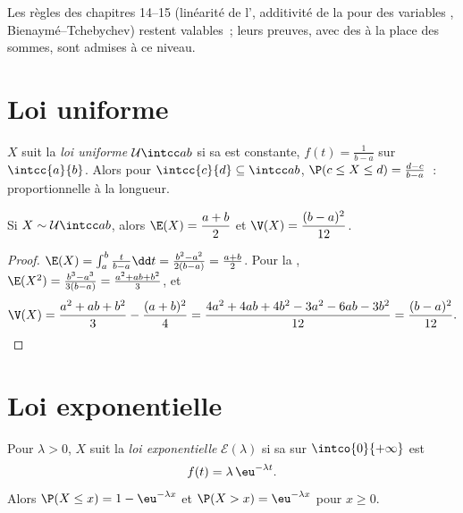 Les règles des chapitres 14--15 (linéarité de l', additivité de la
 pour des variables , Bienaymé--Tchebychev) restent
valables~; leurs preuves, avec des  à la place des sommes, sont
admises à ce niveau.

\section{Loi uniforme}

\begin{definition}\label{def:g12:contdist:uniform}
$X$ suit la \emph{loi uniforme}
$\mathcal U\intcc ab$ si sa  est constante,
$f(t) = \frac{1}{b-a}$ sur $\intcc{a}{b}$. Alors pour
$\intcc{c}{d} \subseteq \intcc ab$,
$\P(c \leq X \leq d) = \frac{d - c}{b - a}$~:  proportionnelle à
la longueur.
\end{definition}

\begin{proposition}\label{prop:g12:contdist:uniformmoments}
Si $X \sim \mathcal U\intcc ab$, alors
$\E(X) = \dfrac{a+b}{2}$ et $\V(X) = \dfrac{(b-a)^2}{12}$.
\end{proposition}

\begin{proof}
$\E(X) = \int_a^b \frac{t}{b-a}\dd t
= \frac{b^2 - a^2}{2(b-a)} = \frac{a+b}{2}$. Pour la ,
$\E(X^2) = \frac{b^3 - a^3}{3(b-a)} = \frac{a^2 + ab + b^2}{3}$, et
\[
\V(X) = \frac{a^2 + ab + b^2}{3} - \frac{(a+b)^2}{4}
= \frac{4a^2 + 4ab + 4b^2 - 3a^2 - 6ab - 3b^2}{12}
= \frac{(b - a)^2}{12}. \qedhere
\]
\end{proof}

\section{Loi exponentielle}

\begin{definition}\label{def:g12:contdist:expo}
Pour $\lambda > 0$, $X$ suit la \emph{loi
exponentielle} $\mathcal E(\lambda)$ si sa 
sur $\intco{0}{+\infty}$ est
\[
f(t) = \lambda\,\eu^{-\lambda t}.
\]
Alors $\P(X \leq x) = 1 - \eu^{-\lambda x}$ et
$\P(X > x) = \eu^{-\lambda x}$ pour $x \geq 0$.
\end{definition}

